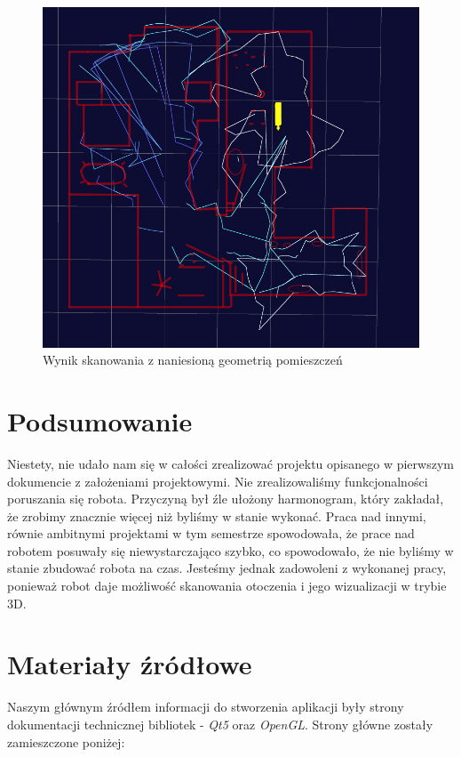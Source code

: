 \documentclass[a4paper]{article}
\begin{document}
\begin{figure}[p]
\centering
\includegraphics[width=\linewidth]{stancjad.png}
\caption{Wynik skanowania z naniesioną geometrią pomieszczeń}
\label{stancjad}
\end{figure}

\section{Podsumowanie}

Niestety, nie udało nam się w całości zrealizować projektu opisanego w pierwszym dokumencie z założeniami projektowymi. Nie zrealizowaliśmy funkcjonalności poruszania się robota. Przyczyną był źle ułożony harmonogram, który zakładał, że zrobimy znacznie więcej niż byliśmy w stanie wykonać. Praca nad innymi, równie ambitnymi projektami w tym semestrze spowodowała, że prace nad robotem posuwały się niewystarczająco szybko, co spowodowało, że nie byliśmy w stanie zbudować robota na czas. Jesteśmy jednak zadowoleni z wykonanej pracy, ponieważ robot daje możliwość skanowania otoczenia i jego wizualizacji w trybie 3D.

\section{Materiały źródłowe}

Naszym głównym źródłem informacji do stworzenia aplikacji były strony dokumentacji technicznej bibliotek - \textit{Qt5} oraz \textit{OpenGL}. Strony główne zostały zamieszczone poniżej:
\end{document}
